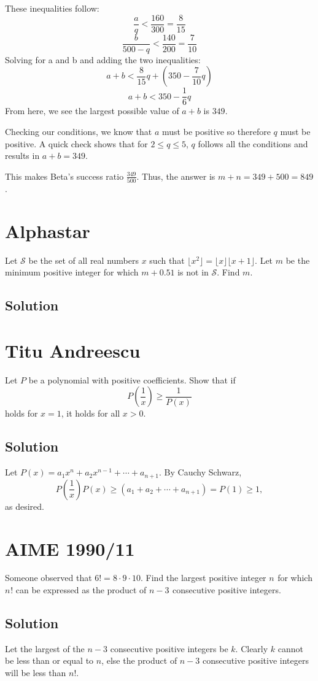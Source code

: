 \documentclass[blue,onecol]{shooting}
\begin{document}
These inequalities follow:\[\frac{a}{q} < \frac{160}{300} = \frac{8}{15}\]\[\frac{b}{500-q} < \frac{140}{200} = \frac{7}{10}\]Solving for a and b and adding the two inequalities:\[a + b < \frac{8}{15}q + (350 - \frac{7}{10}q)\]\[a + b < 350 - \frac{1}{6}q\]From here, we see the largest possible value of $a+b$ is $349$.

Checking our conditions, we know that $a$ must be positive so therefore $q$ must be positive. A quick check shows that for $2\le q \le 5$, $q$ follows all the conditions and results in $a+b=349$.

This makes Beta's success ratio $\frac{349}{500}$. Thus, the answer is $m+n = 349 + 500 = \boxed{849}$.

\section{Alphastar}
Let $\mathcal{S}$ be the set of all real numbers $x$ such that $\lfloor x^2\rfloor=\lfloor x\rfloor\lfloor x+1\rfloor$. Let $m$ be the minimum positive integer for which $m+0.51$ is not in $\mathcal{S}$. Find $m$.
\subsection{Solution}


\section{Titu Andreescu}
Let $P$ be a polynomial with positive coefficients. Show that if \[P\left(\frac1x\right)\ge \frac1{P(x)}\] holds for $x=1$, it holds for all $x>0$.
\subsection{Solution}
Let $P(x)=a_1x^{n}+a_2x^{n-1}+\cdots+a_{n+1}.$ By Cauchy Schwarz, \[P\left(\frac1x\right)P(x)\ge (a_1+a_2+\cdots+a_{n+1})=P(1)\ge 1,\] as desired.
\section{AIME 1990/11}
Someone observed that $6! = 8 \cdot 9 \cdot 10$. Find the largest positive integer $n^{}_{}$ for which $n^{}_{}!$ can be expressed as the product of $n - 3_{}^{}$ consecutive positive integers.
\subsection{Solution}
Let the largest of the $n-3$ consecutive positive integers be $k$. Clearly $k$ cannot be less than or equal to $n$, else the product of $n-3$ consecutive positive integers will be less than $n!$.
\end{document}

